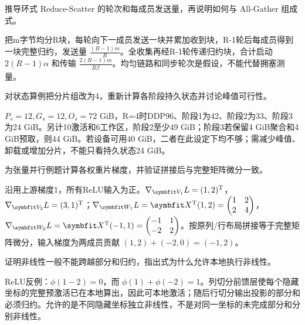 \begin{exercises}
\begin{exercise} 推导环式 Reduce-Scatter 的轮次和每成员发送量，再说明如何与 All-Gather 组成式。

\begin{solution}
把m字节均分R块，每轮向下一成员发送一块并累加收到块，R-1轮后每成员得到一块完整归约，发送量 $\frac{(R-1)m}{R}$。全收集再经R-1轮传递归约块，合计启动 $2(R-1)\alpha$ 和传输 $\frac{2(R-1)m}{R\beta}$。均匀链路和同步轮次是假设，不能代替拥塞测量。
\end{solution}
\end{exercise}

\begin{exercise} 对状态算例把分片组改为4，重新计算各阶段持久状态并讨论峰值可行性。

\begin{solution}
$P_s=12,G_s=12,O_s=72$ GiB，R=4时DDP96、阶段1为42、阶段2为33、阶段3为24 GiB。另计10激活和6工作区，阶段2至少49 GiB；阶段3若保留4 GiB聚合和4 GiB预取，则44 GiB。若设备可用40 GiB，二者在此设定下均不够；需减少峰值、卸载或增加分片，不能只看持久状态24 GiB。
\end{solution}
\end{exercise}

\begin{exercise} 为张量并行例题计算各权重片梯度，并验证拼接后与完整矩阵微分一致。

\begin{solution}
沿用上游梯度1，所有ReLU输入为正。$\nabla_{\mat{V}_1}L=(1,2)^{\mathrm{T}}$，$\nabla_{\mat{V}_2}L=(3,1)^{\mathrm{T}}$；$\nabla_{\mat{W}_1}L=\mat{X}^{\mathrm{T}}(1,2)=\begin{pmatrix}1&2\\2&4\end{pmatrix}$，$\nabla_{\mat{W}_2}L=\mat{X}^{\mathrm{T}}(-1,1)=\begin{pmatrix}-1&1\\-2&2\end{pmatrix}$。按原列/行布局拼接等于完整矩阵微分，输入梯度为两成员贡献 $(1,2)+(-2,0)=(-1,2)$。
\end{solution}
\end{exercise}

\begin{exercise} 证明非线性一般不能跨越部分和归约，指出式为什么允许本地执行非线性。

\begin{solution}
ReLU反例：$\phi(1-2)=0$，而 $\phi(1)+\phi(-2)=1$。列切分前馈层使每个隐藏坐标的完整预激活已在本地算出，因此可本地激活；随后行切分输出投影的部分和必须归约。允许的是不同隐藏坐标独立非线性，不是对同一坐标的未完成部分和分别非线性。
\end{solution}
\end{exercise}


\end{exercises}
